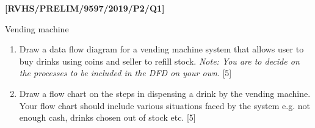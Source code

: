 \item \textbf{{[}RVHS/PRELIM/9597/2019/P2/Q1{]} }

Vending machine
\begin{enumerate}
\item Draw a data flow diagram for a vending machine system that allows
user to buy drinks using coins and seller to refill stock. \emph{Note:
You are to decide on the processes to be included in the DFD on your
own}. \hfill{}{[}5{]}
\item Draw a flow chart on the steps in dispensing a drink by the vending
machine. Your flow chart should include various situations faced by
the system e.g. not enough cash, drinks chosen out of stock etc. \hfill{}{[}5{]}
\end{enumerate}